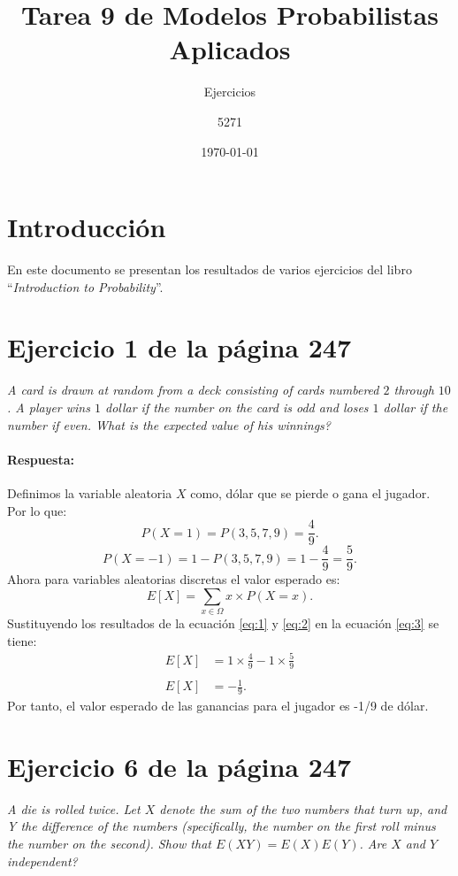 \documentclass{article}
\title{Tarea 9 de Modelos Probabilistas Aplicados}
\subtitle{Ejercicios}
\author{5271}
\date{\today}
\begin{document}
\maketitle
\section{Introducción}
En este documento se presentan los resultados de varios ejercicios del libro ``\textit{Introduction to Probability}''\cite{libProba}.
\section{Ejercicio 1 de la página 247}
\emph{A card is drawn at random from a deck consisting of cards numbered $2$ through $10$. A player wins $1$ dollar if the number on the card is odd and loses $1$ dollar if the number if even. What is the expected value of his winnings?}

\paragraph{Respuesta:}

Definimos la variable aleatoria $X$ como, dólar que se pierde o gana el jugador. Por lo que:
\begin{equation}\label{eq:1}
P(X = 1) = P ({3,5,7,9}) = \frac{4}{9} . 
\end{equation}
\begin{equation}\label{eq:2}
P(X = -1) = 1- P ({3,5,7,9}) = 1- \frac{4}{9} = \frac{5}{9}.
\end{equation}
Ahora para variables aleatorias discretas el valor esperado es:
\begin{equation}\label{eq:3}
 E[X] = \sum_{x \in \Omega} x
	      \times P(X = x).   
\end{equation}
Sustituyendo los resultados de la ecuación \ref{eq:1}  y \ref{eq:2} en la ecuación \ref{eq:3} se tiene: 
\begin{equation}\label{eq:4}
\begin{array}{ll}
 E[X] &= 1 \times \frac{4}{9} - 1 \times \frac{5}{9} \\
       & \\
 E[X]  &= - \frac{1}{9}.
 \end{array}
\end{equation}
 Por tanto, el valor esperado de las ganancias para el jugador es -1/9 de dólar.


\section{Ejercicio 6 de la página 247}
\emph{A die is rolled twice. Let $X$ denote the sum of the two numbers that turn up, and Y the difference of the numbers (specifically, the number on the first roll minus the number on the second). Show that $E(X Y) = E(X)E(Y )$. Are $X$ and $Y$ independent?}
\end{document}
